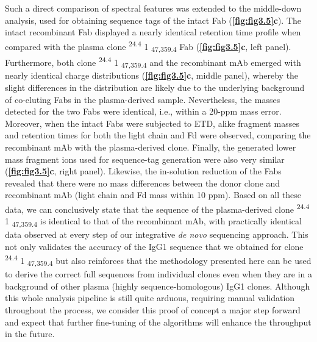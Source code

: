 Such a direct comparison of spectral features was extended to the middle-down analysis, used for obtaining sequence tags of the intact Fab (\textbf{\autoref{fig:fig3.5}c}). The intact recombinant Fab displayed a nearly identical retention time profile when compared with the plasma clone \textsuperscript{24.4} 1 \textsubscript{47,359.4} Fab (\textbf{\autoref{fig:fig3.5}c}, left panel). Furthermore, both clone \textsuperscript{24.4} 1 \textsubscript{47,359.4} and the recombinant mAb emerged with nearly identical charge distributions (\textbf{\autoref{fig:fig3.5}c}, middle panel), whereby the slight differences in the distribution are likely due to the underlying background of co-eluting Fabs in the plasma-derived sample. Nevertheless, the masses detected for the two Fabs were identical, i.e., within a 20-ppm mass error. Moreover, when the intact Fabs were subjected to ETD, alike fragment masses and retention times for both the light chain and Fd were observed, comparing the recombinant mAb with the plasma-derived clone. Finally, the generated lower mass fragment ions used for sequence-tag generation were also very similar (\textbf{\autoref{fig:fig3.5}c}, right panel). Likewise, the in-solution reduction of the Fabs revealed that there were no mass differences between the donor clone and recombinant mAb (light chain and Fd mass within 10 ppm).
Based on all these data, we can conclusively state that the sequence of the plasma-derived clone \textsuperscript{24.4} 1 \textsubscript{47,359.4} is identical to that of the recombinant mAb, with practically identical data observed at every step of our integrative \emph{de novo} sequencing approach. This not only validates the accuracy of the IgG1 sequence that we obtained for clone \textsuperscript{24.4} 1 \textsubscript{47,359.4} but also reinforces that the methodology presented here can be used to derive the correct full sequences from individual clones even when they are in a background of other plasma (highly sequence-homologous) IgG1 clones. Although this whole analysis pipeline is still quite arduous, requiring manual validation throughout the process, we consider this proof of concept a major step forward and expect that further fine-tuning of the algorithms will enhance the throughput in the future.

